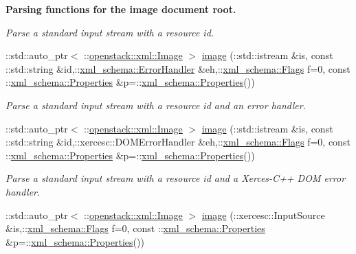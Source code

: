 \begin{Indent}{\bf Parsing functions for the image document root.}
\begin{DoxyCompactItemize}
\begin{DoxyCompactList}\small\item\em Parse a standard input stream with a resource id. \item\end{DoxyCompactList}\item 
::std::auto\_\-ptr$<$ ::\hyperlink{classopenstack_1_1xml_1_1Image}{openstack::xml::Image} $>$ \hyperlink{namespaceopenstack_1_1xml_a7955f282cee10116ec00aebb58b2152e}{image} (::std::istream \&is, const ::std::string \&id,::\hyperlink{namespacexml__schema_ab1c9361bfd3b404eaabf0c31eded79dc}{xml\_\-schema::ErrorHandler} \&eh,::\hyperlink{namespacexml__schema_affb4c227cbd9aa7453dd1dc5a1401943}{xml\_\-schema::Flags} f=0, const ::\hyperlink{namespacexml__schema_ad27ce19a7ee1d3b1064092648898f64c}{xml\_\-schema::Properties} \&p=::\hyperlink{namespacexml__schema_ad27ce19a7ee1d3b1064092648898f64c}{xml\_\-schema::Properties}())
\begin{DoxyCompactList}\small\item\em Parse a standard input stream with a resource id and an error handler. \item\end{DoxyCompactList}\item 
::std::auto\_\-ptr$<$ ::\hyperlink{classopenstack_1_1xml_1_1Image}{openstack::xml::Image} $>$ \hyperlink{namespaceopenstack_1_1xml_a57f24f66f900b096a91951068d89f0e4}{image} (::std::istream \&is, const ::std::string \&id,::xercesc::DOMErrorHandler \&eh,::\hyperlink{namespacexml__schema_affb4c227cbd9aa7453dd1dc5a1401943}{xml\_\-schema::Flags} f=0, const ::\hyperlink{namespacexml__schema_ad27ce19a7ee1d3b1064092648898f64c}{xml\_\-schema::Properties} \&p=::\hyperlink{namespacexml__schema_ad27ce19a7ee1d3b1064092648898f64c}{xml\_\-schema::Properties}())
\begin{DoxyCompactList}\small\item\em Parse a standard input stream with a resource id and a Xerces-\/C++ DOM error handler. \item\end{DoxyCompactList}\item 
::std::auto\_\-ptr$<$ ::\hyperlink{classopenstack_1_1xml_1_1Image}{openstack::xml::Image} $>$ \hyperlink{namespaceopenstack_1_1xml_a10cb3421528136ffb22b4c85fd30a428}{image} (::xercesc::InputSource \&is,::\hyperlink{namespacexml__schema_affb4c227cbd9aa7453dd1dc5a1401943}{xml\_\-schema::Flags} f=0, const ::\hyperlink{namespacexml__schema_ad27ce19a7ee1d3b1064092648898f64c}{xml\_\-schema::Properties} \&p=::\hyperlink{namespacexml__schema_ad27ce19a7ee1d3b1064092648898f64c}{xml\_\-schema::Properties}())

\end{DoxyCompactItemize}
\end{Indent}
